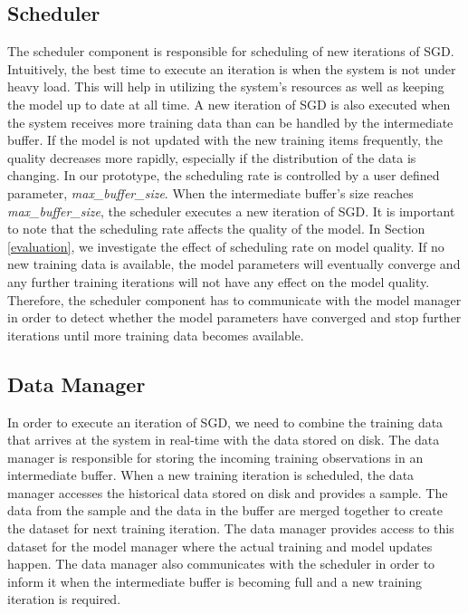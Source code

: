 \documentclass{vldb}
\begin{document}
\subsection{Scheduler}\label{scheduler}
The scheduler component is responsible for scheduling of new iterations of SGD.
Intuitively, the best time to execute an iteration is when the system is not under heavy load.
This will help in utilizing the system's resources as well as keeping the model up to date at all time.
A new iteration of SGD is also executed when the system receives more training data than can be handled by the intermediate buffer.
If the model is not updated with the new training items frequently, the quality decreases more rapidly, especially if the distribution of the data is changing.
In our prototype, the scheduling rate is controlled by a user defined parameter, \textit{max\_buffer\_size}.
When the intermediate buffer's size reaches \textit{max\_buffer\_size}, the scheduler executes a new iteration of SGD.
It is important to note that the scheduling rate affects the quality of the model.
In Section \ref{evaluation}, we investigate the effect of scheduling rate on model quality.
If no new training data is available, the model parameters will eventually converge and any further training iterations will not have any effect on the model quality.
Therefore, the scheduler component has to communicate with the model manager in order to detect whether the model parameters have converged and stop further iterations until more training data becomes available.

\subsection{Data Manager} \label{data-manager}
In order to execute an iteration of SGD, we need to combine the training data that arrives at the system in real-time with the data stored on disk.
The data manager is responsible for storing the incoming training observations in an intermediate buffer.
When a new training iteration is scheduled, the data manager accesses the historical data stored on disk and provides a sample.
The data from the sample and the data in the buffer are merged together to create the dataset for next training iteration.
The data manager provides access to this dataset for the model manager where the actual training and model updates happen.
The data manager also communicates with the scheduler in order to inform it when the intermediate buffer is becoming full and a new training iteration is required. 
\end{document}
